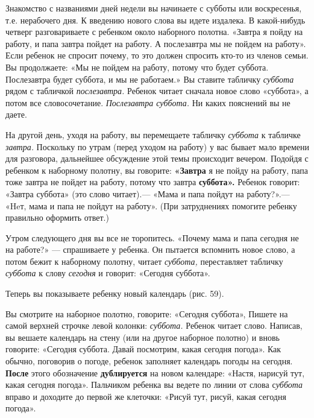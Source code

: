 \documentclass[a5paper]{book}
\renewcommand{\emph}[1]{\textit{#1}}
\begin{document}
Знакомство с названиями дней недели вы начинаете с субботы или
воскресенья, т.е. нерабочего дня. К введению нового слова вы идете
издалека. В какой-нибудь четверг разговариваете с ребенком около
наборного полотна. «Завтра я пойду на работу, и папа завтра пойдет на
работу. А послезавтра мы не пойдем на работу». Если ребенок не спросит
почему, то это должен спросить кто-то из членов семьи. Вы продолжаете:
«Мы не пойдем на работу, потому что будет суббота. Послезавтра будет
суббота, и мы не работаем.» Вы ставите табличку \emph{суббота} рядом с
табличкой \emph{послезавтра.} Ребенок читает сначала новое слово
«суббота», а потом все словосочетание. \emph{Послезавтра суббота.} Ни
каких пояснений вы не даете.

На другой день, уходя на работу, вы перемещаете табличку \emph{суббота}
к табличке \emph{завтра.} Поскольку по утрам (перед уходом на работу) у
вас бывает мало времени для разговора, дальнейшее обсуждение этой темы
происходит вечером. Подойдя с ребенком к наборному полотну, вы говорите:
\textbf{«Завтра} я не пойду на работу, папа тоже завтра не пойдет на
работу, потому что завтра \textbf{суббота».} Ребенок говорит: «Завтра
суббота» (это слово читает).--- «Мама и папа пойдут на работу?».---
«Heт, мама и папа не пойдут на работу». (При затруднениях помогите
ребенку правильно оформить ответ.)

Утром следующего дня вы все не торопитесь. «Почему мама и папа сегодня
не на работе?» --- спрашиваете у ребенка. Он пытается вспомнить новое
слово, а потом бежит к наборному полотну, читает \emph{суббота,}
переставляет табличку \emph{суббота} к слову \emph{сегодня} и говорит:
«Сегодня суббота».

Теперь вы показываете ребенку новый календарь (рис. 59).

Вы смотрите на наборное полотно, говорите: «Сегодня суббота», Пишете на
самой верхней строчке левой колонки: \emph{суббота.} Ребенок читает
слово. Написав, вы вешаете календарь на стену (или на другое наборное
полотно) и вновь говорите: «Сегодня суббота. Давай посмотрим, какая
сегодня погода». Как обычно, поговорив о погоде, ребенок заполняет
календарь погоды на сегодня. \textbf{После} этого обозначение
\textbf{дублируется} на новом календаре: «Настя, нарисуй тут, какая
сегодня погода». Пальчиком ребенка вы ведете по линии от слова
с\emph{уббота} вправо и доходите до первой же клеточки: «Рисуй тут,
рисуй, какая сегодня погода».
\end{document}
